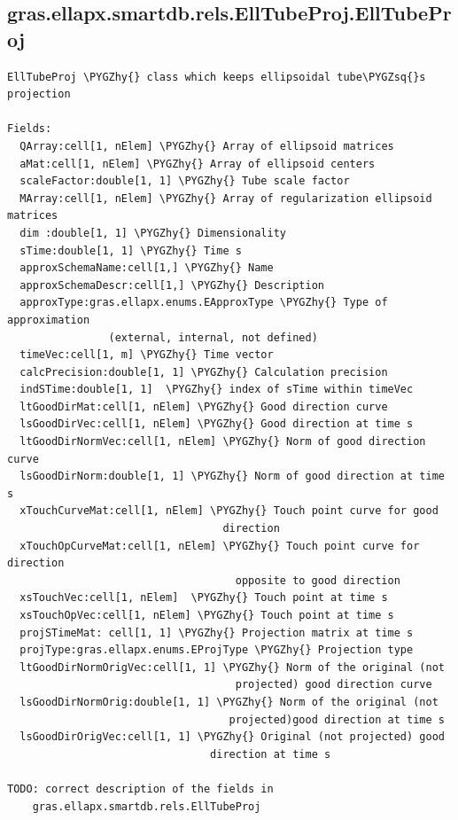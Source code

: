 \documentclass[letterpaper,10pt,english]{sphinxmanual}
\def\PYGZhy{\char`\-}
\def\PYGZsq{\char`\'}
\begin{document}
\subsection{gras.ellapx.smartdb.rels.EllTubeProj.EllTubeProj}
\label{chap_functions:gras-ellapx-smartdb-rels-elltubeproj-elltubeproj}
\begin{Verbatim}[commandchars=\\\{\}]
EllTubeProj \PYGZhy{} class which keeps ellipsoidal tube\PYGZsq{}s projection

Fields:
  QArray:cell[1, nElem] \PYGZhy{} Array of ellipsoid matrices
  aMat:cell[1, nElem] \PYGZhy{} Array of ellipsoid centers
  scaleFactor:double[1, 1] \PYGZhy{} Tube scale factor
  MArray:cell[1, nElem] \PYGZhy{} Array of regularization ellipsoid matrices
  dim :double[1, 1] \PYGZhy{} Dimensionality
  sTime:double[1, 1] \PYGZhy{} Time s
  approxSchemaName:cell[1,] \PYGZhy{} Name
  approxSchemaDescr:cell[1,] \PYGZhy{} Description
  approxType:gras.ellapx.enums.EApproxType \PYGZhy{} Type of approximation
                (external, internal, not defined)
  timeVec:cell[1, m] \PYGZhy{} Time vector
  calcPrecision:double[1, 1] \PYGZhy{} Calculation precision
  indSTime:double[1, 1]  \PYGZhy{} index of sTime within timeVec
  ltGoodDirMat:cell[1, nElem] \PYGZhy{} Good direction curve
  lsGoodDirVec:cell[1, nElem] \PYGZhy{} Good direction at time s
  ltGoodDirNormVec:cell[1, nElem] \PYGZhy{} Norm of good direction curve
  lsGoodDirNorm:double[1, 1] \PYGZhy{} Norm of good direction at time s
  xTouchCurveMat:cell[1, nElem] \PYGZhy{} Touch point curve for good
                                  direction
  xTouchOpCurveMat:cell[1, nElem] \PYGZhy{} Touch point curve for direction
                                    opposite to good direction
  xsTouchVec:cell[1, nElem]  \PYGZhy{} Touch point at time s
  xsTouchOpVec:cell[1, nElem] \PYGZhy{} Touch point at time s
  projSTimeMat: cell[1, 1] \PYGZhy{} Projection matrix at time s
  projType:gras.ellapx.enums.EProjType \PYGZhy{} Projection type
  ltGoodDirNormOrigVec:cell[1, 1] \PYGZhy{} Norm of the original (not
                                    projected) good direction curve
  lsGoodDirNormOrig:double[1, 1] \PYGZhy{} Norm of the original (not
                                   projected)good direction at time s
  lsGoodDirOrigVec:cell[1, 1] \PYGZhy{} Original (not projected) good
                                direction at time s

TODO: correct description of the fields in
    gras.ellapx.smartdb.rels.EllTubeProj
\end{Verbatim}
\end{document}
